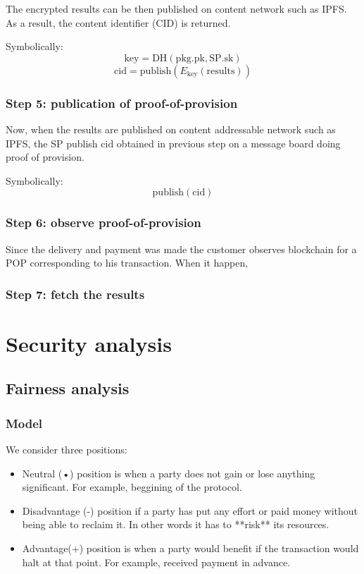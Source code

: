\documentclass{article}
\begin{document}
The encrypted results can be then published on content network such as IPFS. As a result, the content identifier (CID) is returned.

Symbolically:
$$\mathrm{key} = \mathrm{DH}(\mathrm{pkg}.\mathrm{pk}, \mathrm{SP}.\mathrm{sk})$$
$$\mathrm{cid} = \mathrm{publish}(E_\mathrm{key}(\mathrm{results}))$$

\subsubsection{Step 5: publication of proof-of-provision}
Now, when the results are published on content addressable network such as IPFS, the SP publish $\mathrm{cid}$ obtained in previous step on a message board doing proof of provision. 

Symbolically:
$$\mathrm{publish}(\mathrm{cid})$$

\subsubsection{Step 6: observe proof-of-provision}

Since the delivery and payment was made the customer observes blockchain for a POP corresponding to his transaction. When it happen,   

\subsubsection{Step 7: fetch the results}




\section{Security analysis}
\subsection{Fairness analysis}
\subsubsection{Model}
We consider three positions:
\begin{itemize}
\item Neutral (•) position is when a party does not gain or lose anything significant. For example, beggining of the protocol.
\item Disadvantage (-) position if a party has put any effort or paid money without being able to reclaim it. In other words it has to **risk** its resources.
\item Advantage(+) position is when a party would benefit if the transaction would halt at that point. For example, received payment in advance.
\end{itemize}
\end{document}
